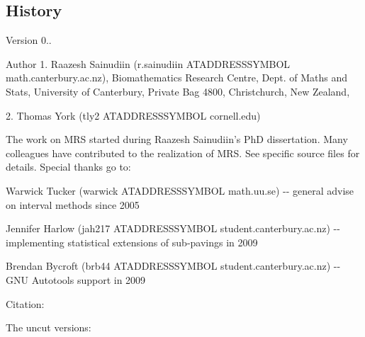 \hypertarget{index_mainpage_sec_history}{}\subsection{\-History}\label{index_mainpage_sec_history}
\begin{DoxyVersion}{\-Version}
0.. 
\end{DoxyVersion}
\begin{DoxyAuthor}{\-Author}
1. \-Raazesh \-Sainudiin (r.\-sainudiin \-A\-T\-A\-D\-D\-R\-E\-S\-S\-S\-Y\-M\-B\-O\-L math.\-canterbury.\-ac.\-nz), \-Biomathematics \-Research \-Centre, \-Dept. of \-Maths and \-Stats, \-University of \-Canterbury, \-Private \-Bag 4800, \-Christchurch, \-New \-Zealand,

2. \-Thomas \-York (tly2 \-A\-T\-A\-D\-D\-R\-E\-S\-S\-S\-Y\-M\-B\-O\-L cornell.\-edu)
\end{DoxyAuthor}
\-The work on \-M\-R\-S started during \-Raazesh \-Sainudiin's \-Ph\-D dissertation. \-Many colleagues have contributed to the realization of \-M\-R\-S. \-See specific source files for details. \-Special thanks go to\-:
\begin{DoxyItemize}
\item \-Warwick \-Tucker (warwick \-A\-T\-A\-D\-D\-R\-E\-S\-S\-S\-Y\-M\-B\-O\-L math.\-uu.\-se) -\/-\/ general advise on interval methods since 2005
\item \-Jennifer \-Harlow (jah217 \-A\-T\-A\-D\-D\-R\-E\-S\-S\-S\-Y\-M\-B\-O\-L student.\-canterbury.\-ac.\-nz) -\/-\/ implementing statistical extensions of sub-\/pavings in 2009
\item \-Brendan \-Bycroft (brb44 \-A\-T\-A\-D\-D\-R\-E\-S\-S\-S\-Y\-M\-B\-O\-L student.\-canterbury.\-ac.\-nz) -\/-\/ \-G\-N\-U \-Autotools support in 2009
\end{DoxyItemize}

\begin{DoxyParagraph}{\-Citation\-:}

\end{DoxyParagraph}
\-The uncut versions\-:


